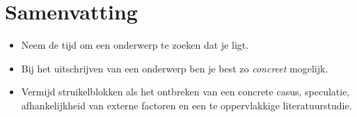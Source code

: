 \section{Samenvatting}%
\label{sec:onderwerp_samenvatting}

\begin{itemize}
  \item Neem de tijd om een onderwerp te zoeken dat je ligt.
  \item Bij het uitschrijven van een onderwerp ben je best zo \emph{concreet} mogelijk.
  \item Vermijd struikelblokken als het ontbreken van een concrete casus, speculatie, afhankelijkheid van externe factoren en een te oppervlakkige literatuurstudie.
\end{itemize}
